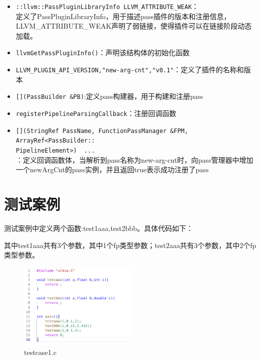 \documentclass[11pt, a4paper, oneside,UTF8]{ctexart}
\begin{document}
\begin{itemize}[before=]
    \setlength{\itemsep}{0em}
    \item \texttt{::llvm::PassPluginLibraryInfo LLVM\_ATTRIBUTE\_WEAK}：\\定义了PassPluginLibraryInfo，用于描述pass插件的版本和注册信息，LLVM\_ATTRIBUTE\_WEAK声明了弱链接，使得插件可以在链接阶段动态加载。
    \item \texttt{llvmGetPassPluginInfo()}：声明该结构体的初始化函数
    \item \texttt{LLVM\_PLUGIN\_API\_VERSION,"new-arg-cnt","v0.1"}：定义了插件的名称和版本
    \item \texttt{[](PassBuilder \&PB)}:定义pass构建器，用于构建和注册pass
    \item \texttt{registerPipelineParsingCallback}：注册回调函数
    \item \texttt{[](StringRef PassName, FunctionPassManager \&FPM, ArrayRef<PassBuilder::\\PipelineElement>) { ... }}\\：定义回调函数体，当解析到pass名称为new-arg-cnt时，向pass管理器中增加一个newArgCnt的pass实例，并且返回true表示成功注册了pass
    
\end{itemize}

\section{测试案例}

测试案例中定义两个函数:test1aaa,test2bbb。具体代码如下：

其中test1aaa共有3个参数，其中1个fp类型参数；test2aaa共有3个参数，其中2个fp类型参数。

\begin{figure}[h]
    \centering
    \includegraphics[width=0.5\textwidth]{./figure/test_1.png}
    \caption{testcase1.c}
    \label{figure:3.1}
\end{figure}
\end{document}
